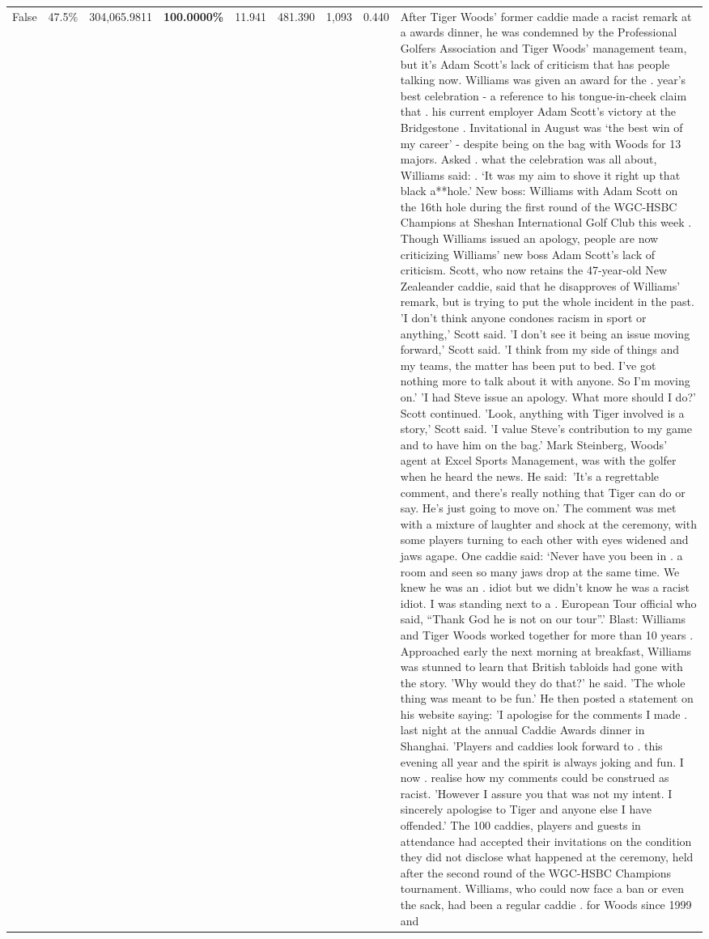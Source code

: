 \begin{table}[H]
\begin{tabular}{lllrlllll}
False & 47.5\% & 304,065.9811 & \bfseries \color{red} 100.0000\% & 11.941 & 481.390 & 1,093 & 0.440 & After Tiger Woods' former caddie made a racist remark at a awards dinner, he was condemned by the Professional Golfers Association and Tiger Woods' management team, but it's Adam Scott's lack of criticism that has people talking now. Williams was given an award for the . year’s best celebration - a reference to his tongue-in-cheek claim that . his current employer Adam Scott’s victory at the Bridgestone . Invitational in August was ‘the best win of my career’ - despite being on the bag with Woods for 13 majors. Asked . what the celebration was all about, Williams said: . ‘It was my aim to shove it right up that black a**hole.’ New boss: Williams with Adam Scott  on the 16th hole during the first round of the WGC-HSBC Champions at Sheshan International Golf Club this week . Though Williams issued an apology, people are now criticizing Williams' new boss Adam Scott's lack of criticism. Scott, who now retains the 47-year-old New Zealeander caddie, said that he disapproves of Williams' remark, but is trying to put the whole incident in the past. 'I don't think anyone condones racism in sport or anything,' Scott said. 'I don't see it being an issue moving forward,' Scott said. 'I think from my side of things and my teams, the matter has been put to bed. I've got nothing more to talk about it with anyone. So I'm moving on.' 'I had Steve issue an apology. What more should I do?' Scott continued. 'Look, anything with Tiger involved is a story,' Scott said. 'I value Steve's contribution to my game and to have him on the bag.' Mark Steinberg, Woods' agent at Excel Sports Management, was with the golfer when he heard the news. He said: 'It's a regrettable comment, and there's really nothing that Tiger can do or say. He's just going to move on.' The comment was met with a mixture of laughter and shock at the ceremony, with some players turning to each other with eyes widened and jaws agape. One caddie said: ‘Never have you been in . a room and seen so many jaws drop at the same time. We knew he was an . idiot but we didn’t know he was a racist idiot. I was standing next to a . European Tour official who said, “Thank God he is not on our tour”.’ Blast: Williams and Tiger Woods worked together for more than 10 years . Approached early the next morning at breakfast, Williams was stunned to learn that British tabloids had gone with the story. 'Why would they do that?' he said. 'The whole thing was meant to be fun.' He then posted a statement on his website saying: 'I apologise for the comments I made . last night at the annual Caddie Awards dinner in Shanghai. 'Players and caddies look forward to . this evening all year and the spirit is always joking and fun. I now . realise how my comments could be construed as racist. 'However I assure you that was not my intent. I sincerely apologise to Tiger and anyone else I have offended.' The 100 caddies, players and guests in attendance had accepted their invitations on the condition they did not disclose what happened at the ceremony, held after the second round of the WGC-HSBC Champions tournament. Williams, who could now face a ban or even the sack, had been a regular caddie . for Woods since 1999 and 
\end{tabular}
\end{table}
